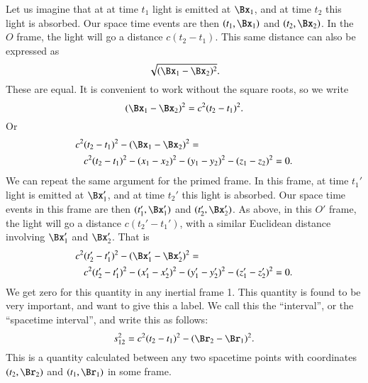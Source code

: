 Let us imagine that at at time \(t_1\) light is emitted at \(\Bx_1\), and at time \(t_2\) this light is absorbed.  Our space time events are then \((t_1, \Bx_1)\) and \((t_2, \Bx_2)\).  In the \(O\) frame, the light will go a distance \(c(t_2 - t_1)\).  This same distance can also be expressed as
%
\begin{equation}\label{eqn:relativisticElectrodynamicsL2:10}
\sqrt{ (\Bx_1 - \Bx_2)^2}.
\end{equation}
%
These are equal.  It is convenient to work without the square roots, so we write
%
\begin{equation}\label{eqn:relativisticElectrodynamicsL2:20}
(\Bx_1 - \Bx_2)^2 = c^2 (t_2 - t_1)^2.
\end{equation}
%
Or
%
\begin{equation}\label{eqn:relativisticElectrodynamicsL2:30}
\begin{aligned}
c^2 &(t_2 - t_1)^2 - (\Bx_1 - \Bx_2)^2 = \\
&c^2 (t_2 - t_1)^2
- (x_1 - x_2)^2
- (y_1 - y_2)^2
- (z_1 - z_2)^2 = 0.
\end{aligned}
\end{equation}
%
We can repeat the same argument for the primed frame.  In this frame, at time \(t_1'\) light is emitted at \(\Bx_1'\), and at time \(t_2'\) this light is absorbed.  Our space time events in this frame are then \((t_1', \Bx_1')\) and \((t_2', \Bx_2')\).  As above, in this \(O'\) frame, the light will go a distance \(c(t_2' - t_1')\), with a similar Euclidean distance involving \(\Bx_1'\) and \(\Bx_2'\).  That is
%
\begin{equation}\label{eqn:relativisticElectrodynamicsL2:40}
\begin{aligned}
c^2 &(t_2' - t_1')^2 - (\Bx_1' - \Bx_2')^2 = \\
&c^2 (t_2' - t_1')^2
- (x_1' - x_2')^2
- (y_1' - y_2')^2
- (z_1' - z_2')^2 = 0.
\end{aligned}
\end{equation}
%
We get zero for this quantity in any inertial frame 1.  This quantity is found to be very important, and want to give this a label.  We call this the ``interval'', or the ``spacetime interval'', and write this as follows:
%
\begin{equation}\label{eqn:relativisticElectrodynamicsL2:50}
s_{12}^2 = c^2 (t_2 - t_1)^2 - (\Br_2 - \Br_1)^2.
\end{equation}
%
This is a quantity calculated between any two spacetime points with coordinates \((t_2, \Br_2)\) and \((t_1, \Br_1)\) in some frame.

